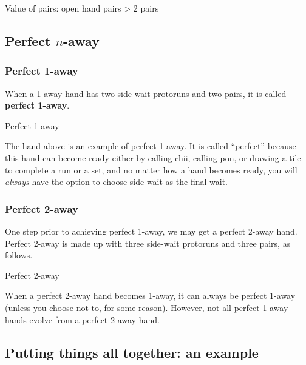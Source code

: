 {\bigskip

\color{MyRed}
\begin{itembox}[c]{Value of pairs: open hand}
\centering{} pairs > 2 pairs
\end{itembox}\normalcolor

\bigskip

\subsection{Perfect $n$-away}\label{sec:perfect}

\subsubsection{Perfect 1-away} 
When a 1-away hand has two side-wait protoruns and two pairs, it is called {\bf perfect 1-away}. 
\bigskip
\begin{itembox}[r]{Perfect 1-away}
\bp
{}\bai\bai\bai\\
\ep
\end{itembox}
The hand above is an example of perfect 1-away. It is called ``perfect'' because this hand can become ready either by calling {\jap chii}, calling {\jap pon}, or drawing a tile to complete a run or a set, and no matter how a hand becomes ready, you will \emph{always} have the option to choose side wait as the final wait.

\subsubsection{Perfect 2-away}
One step prior to achieving perfect 1-away, we may get a perfect 2-away hand. Perfect 2-away is made up with three side-wait protoruns and three pairs, as follows.
\bigskip
\begin{itembox}[r]{Perfect 2-away}
\bp
{}\bai\bai\bai\\
\ep
\end{itembox}
When a perfect 2-away hand becomes 1-away, it can always be perfect 1-away (unless you choose not to, for some reason). However, not all perfect 1-away hands evolve from a perfect 2-away hand. 

\newpage
\subsection{Putting things all together: an example}\label{sec:ptat}

}
